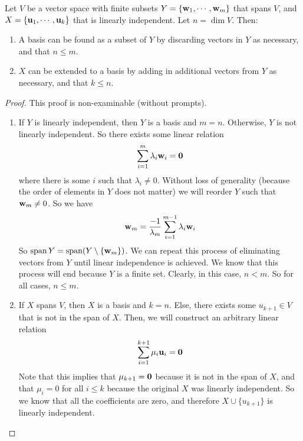 \begin{proposition}
	Let \(V\) be a vector space with finite subsets \(Y = \{ \vb w_1, \cdots, \vb w_m \}\) that spans \(V\), and \(X = \{ \vb u_1, \cdots, \vb u_k \}\) that is linearly independent.
	Let \(n = \dim V\).
	Then:
	\begin{enumerate}
		\item A basis can be found as a subset of \(Y\) by discarding vectors in \(Y\) as necessary, and that \(n \leq m\).
		\item \(X\) can be extended to a basis by adding in additional vectors from \(Y\) as necessary, and that \(k \leq n\).
	\end{enumerate}
\end{proposition}
\begin{proof}
	This proof is non-examinable (without prompts).
	\begin{enumerate}
		\item If \(Y\) is linearly independent, then \(Y\) is a basis and \(m = n\).
		      Otherwise, \(Y\) is not linearly independent.
		      So there exists some linear relation
		      \[
			      \sum_{i=1}^{m} \lambda_i \vb w_i = \vb 0
		      \]
		      where there is some \(i\) such that \(\lambda_i \neq 0\).
		      Without loss of generality (because the order of elements in \(Y\) does not matter) we will reorder \(Y\) such that \(\vb w_m \neq 0\).
		      So we have
		      \[
			      \vb w_m = \frac{-1}{\lambda_m} \sum_{i=1}^{m-1} \lambda_i \vb w_i
		      \]
		      So \(\operatorname{span} Y = \operatorname{span} (Y \setminus \{ \vb w_m \})\).
		      We can repeat this process of eliminating vectors from \(Y\) until linear independence is achieved.
		      We know that this process will end because \(Y\) is a finite set.
		      Clearly, in this case, \(n < m\).
		      So for all cases, \(n \leq m\).

		\item If \(X\) spans \(V\), then \(X\) is a basis and \(k=n\).
		      Else, there exists some \(u_{k+1} \in V\) that is not in the span of \(X\).
		      Then, we will construct an arbitrary linear relation
		      \[
			      \sum_{i=1}^{k+1} \mu_i \vb u_i = \vb 0
		      \]
		      Note that this implies that \(\mu_{k+1} = \vb 0\) because it is not in the span of \(X\), and that \(\mu_i = 0\) for all \(i \leq k\) because the original \(X\) was linearly independent.
		      So we know that all the coefficients are zero, and therefore \(X \cup \{ u_{k+1} \}\) is linearly independent.


\end{enumerate}
\end{proof}
